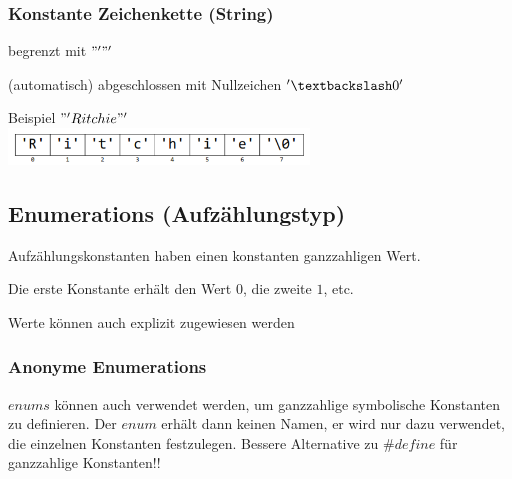  		\subsubsection{Konstante Zeichenkette (String) }
 			\begin{minipage}[t]{9 cm}
 				\begin{compactitem}
 					\item begrenzt mit $"'  "'$
 					\item (automatisch) abgeschlossen mit Nullzeichen $'\textbackslash0'$
 				\end{compactitem}	
 			\end{minipage}
 			\hspace*{0.5cm}
 			\begin{minipage}[t]{9 cm}
 				Beispiel $"'Ritchie"'$\\
 				\includegraphics[width=0.6\textwidth]{pics/Zeichenkonstante.png}
 			\end{minipage}
 	\subsection{Enumerations (Aufzählungstyp)}
 		\begin{minipage}[t]{9 cm}
	 		\vspace*{-0.5cm}
	 		
 		\end{minipage}
 		\hspace*{0.5 cm}
 		\begin{minipage}[t]{8 cm}
 			\begin{compactitem}
 				\item Aufzählungskonstanten haben einen konstanten ganzzahligen Wert.
 				\item Die erste Konstante erhält den Wert $0$, die zweite $1$, etc.
 				\item Werte können auch explizit zugewiesen werden
 			\end{compactitem}
 		\end{minipage}
 		
 		\subsubsection{Anonyme Enumerations}
 			$enums$ können auch verwendet werden, um ganzzahlige symbolische Konstanten zu definieren. Der $enum$ erhält dann keinen Namen, er wird nur dazu verwendet, die einzelnen Konstanten festzulegen. Bessere Alternative zu $\#define$ für ganzzahlige Konstanten!!
 			
 			\vspace*{0.5cm}